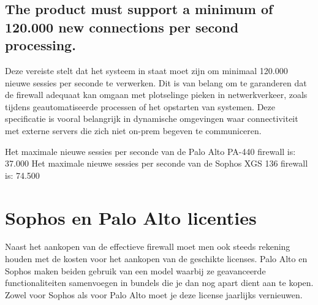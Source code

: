 \subsection{The product must support a minimum of 120.000 new connections per second processing.}
Deze vereiste stelt dat het systeem in staat moet zijn om minimaal 120.000 nieuwe sessies per seconde te verwerken. Dit is van belang om te garanderen dat de firewall adequaat kan omgaan met plotselinge pieken in netwerkverkeer, zoals tijdens geautomatiseerde processen of het opstarten van systemen. Deze specificatie is vooral belangrijk in dynamische omgevingen waar connectiviteit met externe servers die zich niet on-prem begeven te communiceren.

Het maximale nieuwe sessies per seconde van de Palo Alto PA-440 firewall is: 37.000 \newline
Het maximale nieuwe sessies per seconde van de Sophos XGS 136 firewall is: 74.500

\begin{table}[h!]
    \centering
    \caption{Vergelijking van maximale gelijktijdige sessies en nieuwe verbindingen per seconde voor PA-440 en XGS 136 firewalls.}
\end{table}
















\section{Sophos en Palo Alto licenties}
Naast het aankopen van de effectieve firewall moet men ook steeds rekening houden met de kosten voor het aankopen van de geschikte licenses. Palo Alto en Sophos maken beiden gebruik van een model waarbij ze
geavanceerde functionaliteiten samenvoegen in bundels die je dan nog apart dient aan te kopen. Zowel voor Sophos als voor Palo Alto moet je deze license jaarlijks vernieuwen.


